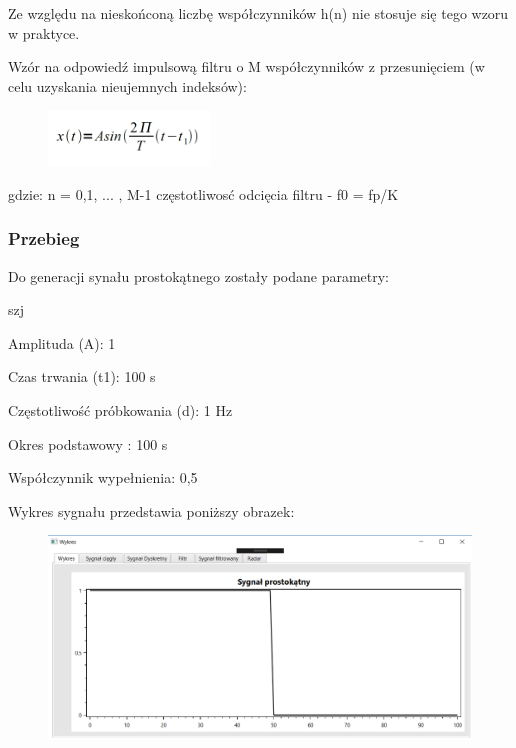 \documentclass[12pt]{article}
\begin{document}
Ze względu na nieskońconą liczbę współczynników h(n) nie stosuje się tego wzoru w praktyce.

Wzór na odpowiedź impulsową filtru o M współczynników z przesunięciem (w celu uzyskania nieujemnych indeksów):

\begin{figure}[h!]
 \centering
 \includegraphics[width=4.3cm]{SinWzor.PNG}
 \vspace{-0.3cm}
 \label{gw}
\end{figure}

gdzie:
\subitem n = 0,1, ... , M-1
\subitem częstotliwosć odcięcia filtru - f0 =  fp/K

\subsubsection{Przebieg}
Do generacji synału prostokątnego zostały podane parametry:

\begin{labeling}{szj}
\item [Amplituda (A):] 1
\item [Czas trwania (t1):] 100 s
\item [Częstotliwość próbkowania (d): ] 1 Hz
\item [Okres podstawowy :] 100 s
\item [Współczynnik wypełnienia:] 0,5
\end{labeling}

Wykres sygnału przedstawia poniższy obrazek:
\begin{figure}[h!]
 \centering
 \includegraphics[width=12.3cm]{prost.PNG}
 \vspace{-0.3cm}
 \label{gw}
\end{figure}
\end{document}
